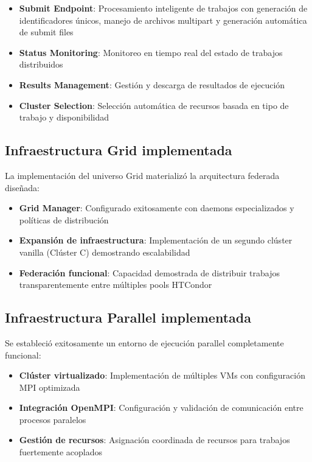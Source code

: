 \begin{itemize}
    \item \textbf{Submit Endpoint}: Procesamiento inteligente de trabajos con generación de identificadores únicos, manejo de archivos multipart y generación automática de submit files
    \item \textbf{Status Monitoring}: Monitoreo en tiempo real del estado de trabajos distribuidos
    \item \textbf{Results Management}: Gestión y descarga de resultados de ejecución
    \item \textbf{Cluster Selection}: Selección automática de recursos basada en tipo de trabajo y disponibilidad
\end{itemize}

\subsection{Infraestructura Grid implementada}
\noindent

La implementación del universo Grid materializó la arquitectura federada diseñada:

\begin{itemize}
    \item \textbf{Grid Manager}: Configurado exitosamente con daemons especializados y políticas de distribución
    \item \textbf{Expansión de infraestructura}: Implementación de un segundo clúster vanilla (Clúster C) demostrando escalabilidad
    \item \textbf{Federación funcional}: Capacidad demostrada de distribuir trabajos transparentemente entre múltiples pools HTCondor
\end{itemize}

\subsection{Infraestructura Parallel implementada}
\noindent

Se estableció exitosamente un entorno de ejecución parallel completamente funcional:

\begin{itemize}
    \item \textbf{Clúster virtualizado}: Implementación de múltiples VMs con configuración MPI optimizada
    \item \textbf{Integración OpenMPI}: Configuración y validación de comunicación entre procesos paralelos
    \item \textbf{Gestión de recursos}: Asignación coordinada de recursos para trabajos fuertemente acoplados
\end{itemize}

